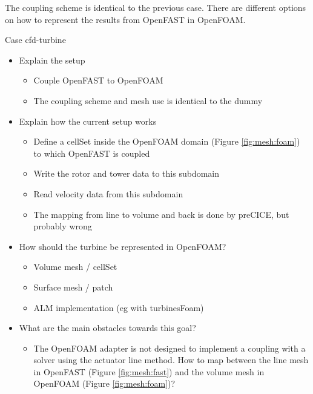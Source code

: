 The coupling scheme is identical to the previous case. There are different options on how to represent the results from OpenFAST in OpenFOAM. 

Case cfd-turbine
\begin{itemize}
	\item Explain the setup
	\begin{itemize}
		\item Couple OpenFAST to OpenFOAM
		\item The coupling scheme and mesh use is identical to the dummy
	\end{itemize}
	\item Explain how the current setup works
	\begin{itemize}
		\item Define a cellSet inside the OpenFOAM domain (Figure \ref{fig:mesh:foam}) to which OpenFAST is coupled
		\item Write the rotor and tower data to this subdomain
		\item Read velocity data from this subdomain
		\item The mapping from line to volume and back is done by preCICE, but probably wrong
	\end{itemize}
	\item How should the turbine be represented in OpenFOAM?
	\begin{itemize}
		\item Volume mesh / cellSet
		\item Surface mesh / patch
		\item ALM implementation (eg with turbinesFoam)\\
	\end{itemize}
	\item What are the main obstacles towards this goal?
	\begin{itemize}
		\item The OpenFOAM adapter is not designed to implement a coupling with a solver using the actuator line method. How to map between the line mesh in OpenFAST (Figure \ref{fig:mesh:fast}) and the volume mesh in OpenFOAM (Figure \ref{fig:mesh:foam})?
	\end{itemize}
\end{itemize}

